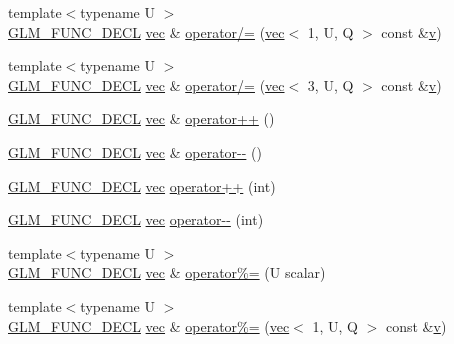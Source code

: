\begin{DoxyCompactItemize}
\item 
{\footnotesize template$<$typename U $>$ }\\\hyperlink{setup_8hpp_ab2d052de21a70539923e9bcbf6e83a51}{G\+L\+M\+\_\+\+F\+U\+N\+C\+\_\+\+D\+E\+CL} \hyperlink{structglm_1_1vec}{vec} \& \hyperlink{structglm_1_1vec_3_013_00_01_t_00_01_q_01_4_a99545518c14ab942bec2a08acd578352}{operator/=} (\hyperlink{structglm_1_1vec}{vec}$<$ 1, U, Q $>$ const \&\hyperlink{_s_d_l__opengl_8h_a10a82eabcb59d2fcd74acee063775f90}{v})
\item 
{\footnotesize template$<$typename U $>$ }\\\hyperlink{setup_8hpp_ab2d052de21a70539923e9bcbf6e83a51}{G\+L\+M\+\_\+\+F\+U\+N\+C\+\_\+\+D\+E\+CL} \hyperlink{structglm_1_1vec}{vec} \& \hyperlink{structglm_1_1vec_3_013_00_01_t_00_01_q_01_4_ab0b3e69d8f5ae4e3a43203c29c1b9918}{operator/=} (\hyperlink{structglm_1_1vec}{vec}$<$ 3, U, Q $>$ const \&\hyperlink{_s_d_l__opengl_8h_a10a82eabcb59d2fcd74acee063775f90}{v})
\item 
\hyperlink{setup_8hpp_ab2d052de21a70539923e9bcbf6e83a51}{G\+L\+M\+\_\+\+F\+U\+N\+C\+\_\+\+D\+E\+CL} \hyperlink{structglm_1_1vec}{vec} \& \hyperlink{structglm_1_1vec_3_013_00_01_t_00_01_q_01_4_a5815270bfae62e24ed90c95b1054cd9d}{operator++} ()
\item 
\hyperlink{setup_8hpp_ab2d052de21a70539923e9bcbf6e83a51}{G\+L\+M\+\_\+\+F\+U\+N\+C\+\_\+\+D\+E\+CL} \hyperlink{structglm_1_1vec}{vec} \& \hyperlink{structglm_1_1vec_3_013_00_01_t_00_01_q_01_4_a7a914447d1121cc6aa1641280f397d95}{operator-\/-\/} ()
\item 
\hyperlink{setup_8hpp_ab2d052de21a70539923e9bcbf6e83a51}{G\+L\+M\+\_\+\+F\+U\+N\+C\+\_\+\+D\+E\+CL} \hyperlink{structglm_1_1vec}{vec} \hyperlink{structglm_1_1vec_3_013_00_01_t_00_01_q_01_4_acdb71d342fb424b32ea13d9ab2fd11b8}{operator++} (int)
\item 
\hyperlink{setup_8hpp_ab2d052de21a70539923e9bcbf6e83a51}{G\+L\+M\+\_\+\+F\+U\+N\+C\+\_\+\+D\+E\+CL} \hyperlink{structglm_1_1vec}{vec} \hyperlink{structglm_1_1vec_3_013_00_01_t_00_01_q_01_4_a1a93cbd62e3ce16b183ec1ba135e7c70}{operator-\/-\/} (int)
\item 
{\footnotesize template$<$typename U $>$ }\\\hyperlink{setup_8hpp_ab2d052de21a70539923e9bcbf6e83a51}{G\+L\+M\+\_\+\+F\+U\+N\+C\+\_\+\+D\+E\+CL} \hyperlink{structglm_1_1vec}{vec} \& \hyperlink{structglm_1_1vec_3_013_00_01_t_00_01_q_01_4_a829ac327596dab68cb82ec753871dabb}{operator\%=} (U scalar)
\item 
{\footnotesize template$<$typename U $>$ }\\\hyperlink{setup_8hpp_ab2d052de21a70539923e9bcbf6e83a51}{G\+L\+M\+\_\+\+F\+U\+N\+C\+\_\+\+D\+E\+CL} \hyperlink{structglm_1_1vec}{vec} \& \hyperlink{structglm_1_1vec_3_013_00_01_t_00_01_q_01_4_a6be535e570c0bf961ffe15426bdca592}{operator\%=} (\hyperlink{structglm_1_1vec}{vec}$<$ 1, U, Q $>$ const \&\hyperlink{_s_d_l__opengl_8h_a10a82eabcb59d2fcd74acee063775f90}{v})

\end{DoxyCompactItemize}
